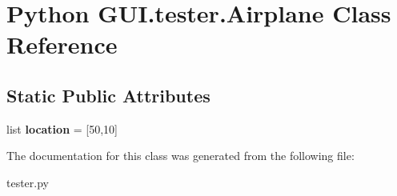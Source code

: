 \hypertarget{class_python_01_g_u_i_1_1tester_1_1_airplane}{}\section{Python G\+U\+I.\+tester.\+Airplane Class Reference}
\label{class_python_01_g_u_i_1_1tester_1_1_airplane}
\subsection*{Static Public Attributes}
\begin{DoxyCompactItemize}
\item 
\mbox{\label{class_python_01_g_u_i_1_1tester_1_1_airplane_a2f689c5aff0b975490e7937733b69056}} 
list {\bfseries location} = \mbox{[}50,10\mbox{]}
\end{DoxyCompactItemize}


The documentation for this class was generated from the following file\+:\begin{DoxyCompactItemize}
\item 
tester.\+py\end{DoxyCompactItemize}

